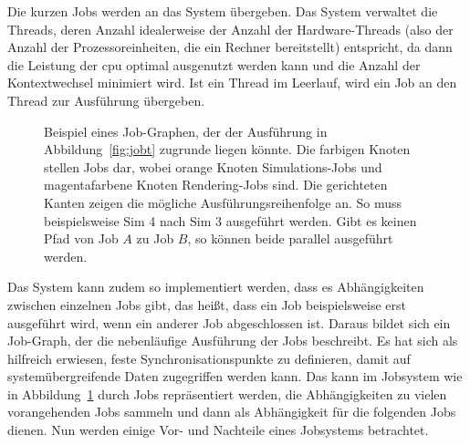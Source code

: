 Die kurzen Jobs werden an das System übergeben. Das System verwaltet die Threads, deren Anzahl idealerweise der Anzahl der Hardware-Threads (also der Anzahl der Prozessoreinheiten, die ein Rechner bereitstellt) entspricht, da dann die Leistung der \ac{cpu} optimal ausgenutzt werden kann und die Anzahl der Kontextwechsel minimiert wird. Ist ein Thread im Leerlauf, wird ein Job an den Thread zur Ausführung übergeben.

\begin{figure}
	\centering
	\caption[Beispiel eines Job-Graphen in einem Jobsystem.]{Beispiel eines Job-Graphen, der der Ausführung in Abbildung~\ref{fig:jobt} zugrunde liegen könnte. Die farbigen Knoten stellen Jobs dar, wobei orange Knoten Simulations-Jobs und magentafarbene Knoten Rendering-Jobs sind. Die gerichteten Kanten zeigen die mögliche Ausführungsreihenfolge an. So muss beispielsweise Sim 4 nach Sim 3 ausgeführt werden. Gibt es keinen Pfad von Job $A$ zu Job $B$, so können beide parallel ausgeführt werden.}\label{fig:jobdependencies}
\end{figure}
Das System kann zudem so implementiert werden, dass es Abhängigkeiten zwischen einzelnen Jobs gibt, das heißt, dass ein Job beispielsweise erst ausgeführt wird, wenn ein anderer Job abgeschlossen ist. Daraus bildet sich ein Job-Graph, der die nebenläufige Ausführung der Jobs beschreibt. Es hat sich als hilfreich erwiesen, feste Synchronisationspunkte zu definieren, damit auf systemübergreifende Daten zugegriffen werden kann. Das kann im Jobsystem wie in Abbildung~\ref{fig:jobdependencies} durch Jobs repräsentiert werden, die Abhängigkeiten zu vielen vorangehenden Jobs sammeln und dann als Abhängigkeit für die folgenden Jobs dienen. Nun werden einige Vor- und Nachteile eines Jobsystems betrachtet.

